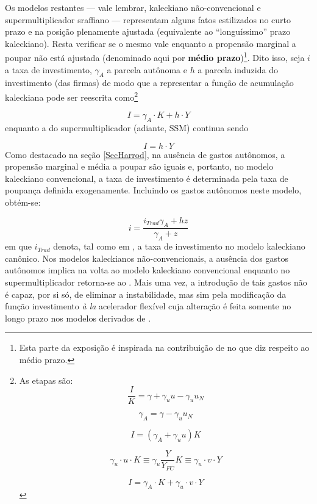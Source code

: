 Os modelos restantes --- vale lembrar, kaleckiano não-convencional e supermultiplicador sraffiano --- representam alguns fatos estilizados no curto prazo e na posição plenamente ajustada (equivalente ao ``longuíssimo'' prazo kaleckiano). Resta verificar se o mesmo vale enquanto a propensão marginal a poupar não está ajustada (denominado aqui por  \textbf{médio prazo})\footnote{Esta parte da exposição é inspirada na contribuição de \textcite{fagundes_role_2017} no que diz respeito ao médio prazo.}. 
Dito isso, seja $i$ a taxa de investimento, $\gamma_A$ a parcela autônoma e $h$ a parcela induzida do investimento (das firmas) de modo que a representar a função de acumulação kaleckiana pode ser reescrita como\footnote{
	As etapas são:
	$$
	\frac{I}{K}  = \gamma + \gamma_uu - \gamma_uu_N
	$$
	
	$$
	\gamma_A = \gamma - \gamma_uu_N
	$$
	
	$$
	I = (\gamma_A + \gamma_uu)K
	$$
	
	$$
	\gamma_u\cdot u \cdot K \equiv \gamma_u\frac{Y}{Y_{FC}}K \equiv \gamma_u\cdot v\cdot Y
	$$
	
	$$
	I = \gamma_A\cdot K + \gamma_u\cdot v\cdot Y
	$$
}

\begin{equation}
\tag{kaleckiana}
I = \gamma_A\cdot K + h\cdot Y
\end{equation}
enquanto a do supermultiplicador (adiante, SSM) continua sendo

\begin{equation}
\tag{SSM}
I = h\cdot Y
\end{equation}
Como destacado na seção \ref{SecHarrod}, na ausência de gastos autônomos, a propensão marginal e média a poupar são iguais e, portanto, no modelo kaleckiano convencional, a taxa de investimento é determinada pela taxa de poupança definida exogenamente. Incluindo os gastos autônomos neste modelo, obtém-se:

$$
i = \frac{i_{Trad}\gamma_A + hz}{\gamma_A + z}
$$
em que $i_{Trad}$ denota, tal como em \textcite{fagundes_role_2017}, a taxa de investimento no modelo kaleckiano canônico. Nos modelos kaleckianos não-convencionais, a ausência dos gastos autônomos implica na volta ao modelo kaleckiano convencional enquanto no supermultiplicador retorna-se ao \textcite{harrod_essay_1939}. Mais uma vez, a introdução de tais gastos não é capaz, por si só, de eliminar a instabilidade, mas sim pela modificação da função investimento \textit{à la} acelerador flexível cuja alteração é feita somente no longo prazo nos modelos derivados de \textcite{allain_tackling_2015}. 

